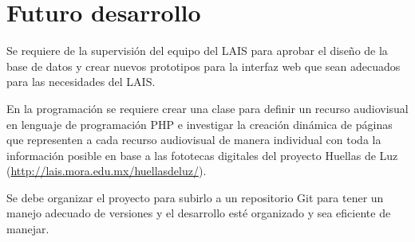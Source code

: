 \documentclass[10pt,letterpaper]{article}
\begin{document}
\section{Futuro desarrollo}
Se requiere de la supervisión del equipo del LAIS para aprobar el diseño de la base de datos y crear nuevos prototipos para la interfaz web que sean adecuados para las necesidades del LAIS.

En la programación se requiere crear una clase para definir un recurso audiovisual en lenguaje de programación PHP e investigar la creación dinámica de páginas que representen a cada recurso audiovisual de manera individual con toda la información posible en base a las fototecas digitales del proyecto Huellas de Luz (\url{http://lais.mora.edu.mx/huellasdeluz/}).

Se debe organizar el proyecto para subirlo a un repositorio Git para tener un manejo adecuado de versiones y el desarrollo esté organizado y sea eficiente de manejar.
\end{document}
